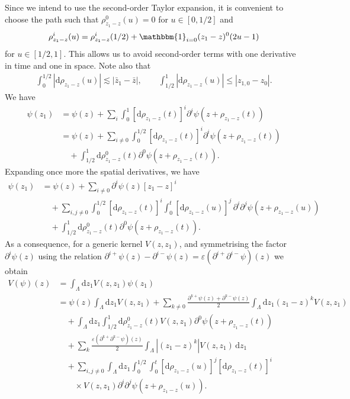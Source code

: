 \documentclass{article}
\numberwithin{equation}{section}
\newcommand{\mathd}{\mathrm{d}}
\theoremstyle{plain}
\theoremstyle{definition}
\begin{document}
Since we intend to use the second-order Taylor expansion, it is convenient to
choose the path such that $\rho^0_{z_1 - z} (u) = 0$ for $u \in [0, 1 / 2]$
and
\[ \rho^i_{z_1 - z} (u) = \rho^i_{z_1 - z} (1 / 2) + \mathbbm{1}_{i =
   0}  (z_1 - z)^0   (2 u - 1) \]
for $u \in [1 / 2, 1]$. This allows us to avoid second-order terms with one
derivative in time and one in space. Note also that
\begin{align*}
  \int_0^{1 / 2} | \mathd \rho _{z_1 - z} (u) |
  \lesssim | \bar{z}_1 - \bar{z} |,
  \qquad
  \int_{1 / 2}^1 | \mathd \rho _{z_1 - z} (u) |
  \leqslant | z_{1,0} - z_0 | .
\end{align*}
We have
\begin{align*}
  \psi (z_1) &=  \psi (z) + \sum_i \int_0^1 [\mathd \rho _{z_1 - z} (t)]^i
  \partial^i \psi (z + \rho_{z_1 - z} (t))\\
 &=  \psi (z) + \sum_{i \neq 0} \int_0^{1 / 2} [\mathd \rho _{z_1 - z}
  (t)]^i \partial^i \psi (z + \rho_{z_1 - z} (t))\\
 &\quad + \int_{1 / 2}^1 \mathd
  \rho_{z_1 - z}^0 (t) \partial^0 \psi (z + \rho_{z_1 - z} (t)) .
\end{align*}
Expanding once more the spatial derivatives, we have
\begin{align*}
  \psi (z_1) &= \psi (z)
  + \sum_{i \neq 0} \partial^i \psi (z) [z_1 - z]^i\\
  &\quad + \sum_{i, j \neq 0} \int_0^{1 / 2}
  [\mathd \rho _{z_1 - z} (t)]^i \int_0^t
  [\mathd \rho _{z_1 - z} (u)]^j\,
  \partial^i \partial^j \psi (z + \rho_{z_1 - z} (u))\\
  &\quad + \int_{1 / 2}^1 \mathd \rho_{z_1 - z}^0 (t)
  \partial^0 \psi (z + \rho_{z_1 - z} (t)) .
\end{align*}
As a consequence, for a generic kernel $V (z, z_1)$, and symmetrising the
factor $\partial^i \psi (z)$ using the relation $\partial^{i+} \psi (z) -
\partial^{i-} \psi (z) = \varepsilon (\partial^{i+} \partial^{i-} \psi)
(z)$ we obtain
  \begin{equation}
  \begin{aligned}
    V (\psi) (z)
    &= \int_{\Lambda} \mathd z_1 V (z, z_1) \psi (z_1)\\
    &= \psi (z) \int_{\Lambda} \mathd z_1 V (z, z_1)
    + \sum_{k \neq 0}
    \frac{\partial^{k+}  \psi (z) + \partial^{k-} \psi (z)}{2}
    \int_{\Lambda} \mathd z_1 (z_1 - z)^k V (z, z_1)\\
    &\quad + \int_{\Lambda} \mathd z_1 \int_{1 / 2}^1
    \mathd \rho_{z_1 - z}^0 (t) V (z, z_1)
    \partial^0 \psi (z + \rho_{z_1 - z} (t))\\
    &\quad + \sum_k \frac{\varepsilon (\partial^{k+} \partial^{k-} \psi)(z)}{2}
    \int_{\Lambda} |(z_1 - z)^k| V (z, z_1)\,\mathd z_1\\
    &\quad + \sum_{i, j \neq 0} \int_{\Lambda} \mathd z_1
    \int_0^{1 / 2}\int_0^t
    [\mathd \rho _{z_1 - z} (u)]^j [\mathd \rho _{z_1 - z} (t)]^i\\
    &\qquad \times V (z, z_1) \partial^i \partial^j
    \psi (z + \rho_{z_1 - z} (u)) .
  \end{aligned} \label{eq:Taylor-tested}
\end{equation}
\end{document}
